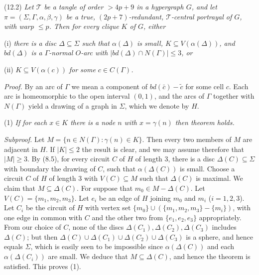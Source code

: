 \stmt
(12.2) \textit{Let $\mathscr{T}$ be a tangle of order $>4p+9$ in a hypergraph $G$, and let $\pi = (\Sigma, \Gamma, \alpha, \beta, \gamma)$ be a true, $(2p+7)$-redundant, $\mathscr{T}$-central portrayal of $G$, with warp $\le p$. Then for every clique $K$ of $G$, either}

\hspace*{12pt}(i) \textit{there is a disc $\Delta \subseteq \Sigma$ such that $\alpha(\Delta)$ is small, $K \subseteq V(\alpha(\Delta))$, and $bd(\Delta)$ is a $\Gamma$-normal $O$-arc with $|bd(\Delta) \cap N(\Gamma)| \le 3$, or}

\hspace*{12pt}(ii) $K \subseteq V(\alpha(c))$ \textit{for some $c \in C(\Gamma)$.}

\textit{Proof.} By an arc of $\Gamma$ we mean a component of $bd(\bar{c}) - \tilde{c}$ for some cell $c$. Each arc is homeomorphic to the open interval $(0, 1)$, and the arcs of $\Gamma$ together with $N(\Gamma)$ yield a drawing of a graph in $\Sigma$, which we denote by $H$.

\hspace*{12pt}(1) \textit{If for each $x \in K$ there is a node $n$ with $x = \gamma(n)$ then theorem holds.}

\textit{Subproof.} Let $M = \{n \in N(\Gamma) \colon \gamma(n) \in K\}$. Then every two members of $M$ are adjacent in $H$. If $|K| \le 2$ the result is clear, and we may assume therefore that $|M| \ge 3$. By (8.5), for every circuit $C$ of $H$ of length 3, there is a disc $\Delta(C) \subseteq \Sigma$ with boundary the drawing of $C$, such that $\alpha(\Delta(C))$ is small. Choose a circuit $C$ of $H$ of length 3 with $V(C) \subseteq M$ such that $\Delta(C)$ is maximal. We claim that $M \subseteq \Delta(C)$. For suppose that $m_0 \in M - \Delta(C)$. Let $V(C) = \{m_1, m_2, m_3\}$. Let $e_i$ be an edge of $H$ joining $m_0$ and $m_i$ ($i = 1, 2, 3$). Let $C_i$ be the circuit of $H$ with vertex set $\{m_0\} \cup (\{m_1, m_2, m_3\} - \{m_i\})$, with one edge in common with $C$ and the other two from $\{e_1, e_2, e_3\}$ appropriately. From our choice of $C$, none of the discs $\Delta(C_1), \Delta(C_2), \Delta(C_3)$ includes $\Delta(C)$; but then $\Delta(C) \cup \Delta(C_1) \cup \Delta(C_2) \cup \Delta(C_3)$ is a sphere, and hence equals $\Sigma$, which is easily seen to be impossible since $\alpha(\Delta(C))$ and each $\alpha(\Delta(C_i))$ are small. We deduce that $M \subseteq \Delta(C)$, and hence the theorem is satisfied. This proves (1).


